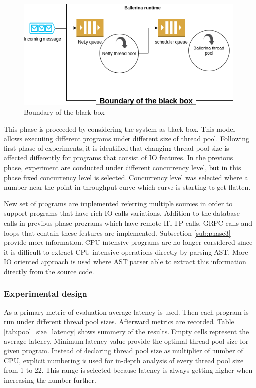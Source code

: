  
\begin{figure}[htbp]
	\begin{center}
		\includegraphics[scale=0.5]{figures/black_box_boundary.png}
	\end{center}
	\caption{Boundary of the black box}
	\label{black_box_boundary}
\end{figure}


This phase is proceeded by considering the system as black box. This model allows executing different programs under different size of thread pool. Following first phase of experiments, it is identified that changing thread pool size is affected differently for programs that consist of IO features. In the previous phase, experiment are conducted under different concurrency level, but in this phase fixed concurrency level is selected. Concurrency level was selected where a number near the point in throughput curve which curve is starting to get flatten.

New set of programs are implemented referring multiple sources \cite{Ballerina_Performance,Ballerina_Website} in order to support programs that have rich IO calls variations. Addition to the database calls in previous phase programs which have remote HTTP calls, GRPC calls and loops that contain these features are implemented. Subsection \ref{sub:phase3} provide more information. CPU intensive programs are no longer considered since it is difficult to extract CPU intensive operations directly by parsing AST. More IO oriented approach is used where AST parser able to extract this information directly from the source code.  
	
\subsubsection{Experimental design} 

As a primary metric of evaluation average latency is used. Then each program is run under different thread pool sizes. Afterward metrics are recorded. Table \ref{tab:pool_size_latency} shows summery of the results. Empty cells represent the average latency. Minimum latency value provide the optimal thread pool size for given program. Instead of declaring thread pool size as multiplier of number of CPU, explicit numbering is used for in-depth analysis of every thread pool size from 1 to 22. This range is selected because latency is always getting higher when increasing the number further.  

